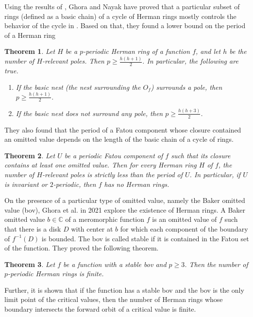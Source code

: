 \documentclass[12pt]{article}
\newtheorem{theorem}{Theorem}[section]
\begin{document}
Using the results of \cite{small,tk}, Ghora and Nayak have proved that a particular subset of rings (defined as a basic chain) of a cycle of Herman rings mostly controls the behavior of the cycle in \cite{relevantpole}. Based on that, they found a lower bound on the period of a Herman ring 
\begin{theorem}
    Let $H$ be a $p$-periodic Herman ring  of a function $f$, and let $h$ be the number of $H$-relevant poles. Then $p \geq \frac{h(h+1)}{2}$. In particular, the following are true.
\begin{enumerate}
\item If the basic nest (the nest surrounding the $O_f$) surrounds a pole, then $p\geq \frac{h(h+1)}{2}$.
\item If the basic nest does not surround any pole, then $p\geq \frac{h (h+3)}{2}$.
\end{enumerate}
\label{lowerbound}
\end{theorem}
They also found that the period of a Fatou component whose closure contained an omitted value depends on the length of the basic chain of a cycle of rings.
\begin{theorem}
Let  $U$ be a periodic Fatou component of $f$ such that its closure contains at least one omitted value. Then for every Herman ring $H$ of $f$, the number of $H$-relevant poles is strictly less than the period of $U$. In particular, if $U$ is invariant or $2$-periodic, then $f$ has no Herman rings.
\label{periodicfatoucomponent}
\end{theorem}
On the presence of a particular type of omitted value, namely the Baker omitted value (bov), Ghora et al. \cite{ghora2} in 2021  explore the existence of Herman rings. A Baker omitted value  $b \in  \mathbb{C}$ of a meromorphic function $f$ is an omitted value of $f$ such that there is a disk $D$ with center at $b$ for which each component of the boundary of $f^{-1}(D)$ is bounded. The bov is called stable if it is contained in the Fatou set of the function. They proved the following theorem.
 
 
 \begin{theorem}\label{pperiodicHR}
	Let  $f$ be a function with a stable bov and $p \geq 3$. 
	Then the number of $p$-periodic Herman rings is finite.
\end{theorem}

Further, it is shown that if the function has a stable bov and the bov is the only limit point of the critical values, then the number of Herman rings whose boundary intersects the forward orbit of a critical value is finite. 
\end{document}
